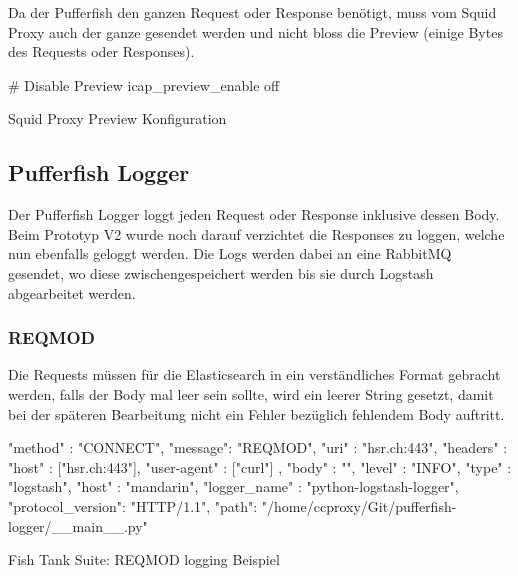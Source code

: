 Da der Pufferfish den ganzen Request oder Response benötigt, muss vom Squid Proxy auch der ganze gesendet werden und nicht bloss die Preview (einige Bytes des Requests oder Responses).

\begin{listing}[H]
\begin{fancycode}
# Disable Preview
icap_preview_enable off
\end{fancycode}
\caption{Squid Proxy Preview Konfiguration}
\label{lst:squid-proxy-preview-disable}
\end{listing}



\subsection{Pufferfish Logger}
Der Pufferfish Logger loggt jeden Request oder Response inklusive dessen Body. Beim Prototyp V2 wurde noch darauf verzichtet die Responses zu loggen, welche nun ebenfalls geloggt werden.
Die Logs werden dabei an eine RabbitMQ gesendet, wo diese zwischengespeichert werden bis sie durch Logstash abgearbeitet werden.


\subsubsection{REQMOD}
Die Requests müssen für die Elasticsearch in ein verständliches Format gebracht werden, falls der Body mal leer sein sollte, wird ein leerer String gesetzt, damit bei der späteren Bearbeitung nicht ein Fehler bezüglich fehlendem Body auftritt.

\begin{listing}[H]
\begin{jscode}
{
  "method" : "CONNECT",
  "message": "REQMOD",
  "uri" : "hsr.ch:443",
  "headers" : {
  	 "host" : ["hsr.ch:443"],
  	 "user-agent" : ["curl"]
   },
  "body" : "",
  "level" : "INFO",
  "type" : "logstash",
  "host" : "mandarin",
  "logger_name" : "python-logstash-logger",
  "protocol_version": "HTTP/1.1",
  "path": "/home/ccproxy/Git/pufferfish-logger/__main__.py" 
}
\end{jscode}
\caption{Fish Tank Suite: REQMOD logging Beispiel}
\label{lst:pufferfish-reqmod-logging}
\end{listing}
\newpage

